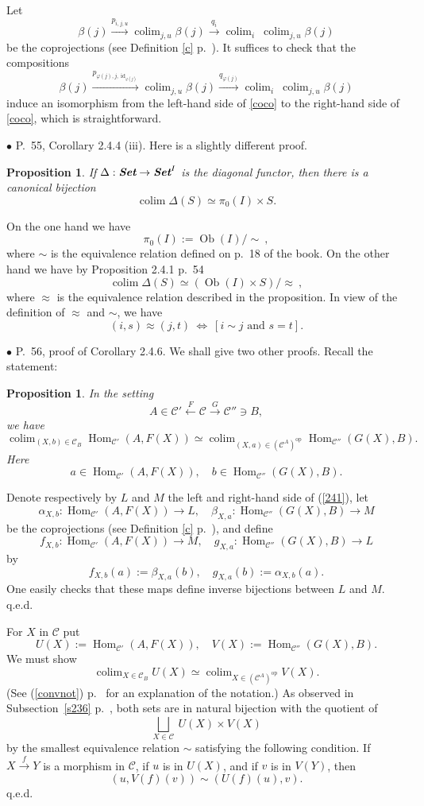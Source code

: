 \documentclass[12pt]{article}
\newtheorem{prop}[thm]{Proposition}
\theoremstyle{remark}%
\newcommand{\bu}{\bullet}
\newcommand{\n}{\noindent}
\newcommand{\C}{\mathcal C}
\newcommand{\p}{\varphi}
\newcommand{\pf}{\n{\em Proof. }}
\newcommand{\xr}{\xrightarrow}
\newcommand{\be}{\begin{equation}}
\newcommand{\ee}{\end{equation}}
\newcommand{\bp}{\begin{prop}}
\newcommand{\ep}{\end{prop}}
\newcommand{\cn}{(See (\ref{convnot}) p.~\pageref{convnot} for an explanation of the notation.) }
\DeclareMathOperator*{\coli}{colim}
\DeclareMathOperator*{\co}{colim}
\DeclareMathOperator{\id}{id}
\DeclareMathOperator{\Hom}{Hom}
\DeclareMathOperator{\h}{Hom}
\DeclareMathOperator{\Ob}{Ob}
\DeclareMathOperator{\op}{op}
\begin{document}
Let 
$$ 
\beta(j)\xrightarrow{p_{i,j,u}}\co_{j,u}\beta(j)\xrightarrow{q_i}\co_i\ \co_{j,u}\beta(j)
$$ 
be the coprojections (see Definition \ref{c} p.~\pageref{c}). It suffices to check that the compositions 
$$
\beta(j)\xrightarrow{p_{\p(j),j,\id_{\p(j)}}}\co_{j,u}\beta(j)\xrightarrow{q_{\p(j)}}\co_i\ \co_{j,u}\beta(j)
$$ 
induce an isomorphism from the left-hand side of \eqref{coco} to the right-hand side of \eqref{coco}, which is straightforward. 


\n$\bu$ P.~55, Corollary 2.4.4 (iii). Here is a slightly different proof. 
%
\bp 
If $\Delta:\textbf{\em Set}\to\textbf{\em Set}^I$ is the diagonal functor, then there is a canonical bijection
$$
\coli\Delta(S)\simeq\pi_0(I)\times S.
$$
\ep 
%
\pf On the one hand we have 
$$
\pi_0(I):=\Ob(I)/\!\!\sim\ , 
$$
where $\sim$ is the equivalence relation defined on p.~18 of the book. On the other hand  we have by Proposition 2.4.1 p.~54
$$
\coli\Delta(S)\simeq(\Ob(I)\times S)/\!\!\approx\ ,
$$
where $\approx$ is the equivalence relation described in the proposition. In view of the definition of $\approx$ and $\sim$, we have 
$$
(i,s)\approx(j,t)\ \iff\ [i\sim j\text{ and }s=t].
$$  


\n$\bu$ P.~56, proof of Corollary 2.4.6. We shall give two other proofs. Recall the statement: 
%
\bp 
In the setting 
% 
\begin{equation}\label{241s}
A\in\C'\xleftarrow{F}\C\xrightarrow{G}\C''\ni B, 
\end{equation} 
% 
we have 
% 
\begin{equation}\label{241} 
\coli_{(X,b)\in\C_B}\Hom_{\C'}(A,F(X))\simeq 
\coli_{(X,a)\in(\C^A)^{\op}}\Hom_{\C''}(G(X),B). 
\end{equation} 
% 
Here  
$$
a\in\Hom_{\C'}(A,F(X)),\quad b\in\Hom_{\C''}(G(X),B). 
$$ 
\ep
% 
\n{\em First proof.} Denote respectively by $L$ and $M$ the left and right-hand side of (\ref{241}), let 
$$
\alpha_{X,b}:\Hom_{\C'}(A,F(X))\to L,\quad\beta_{X,a}:\Hom_{\C''}(G(X),B)\to M
$$
be the coprojections (see Definition \ref{c} p.~\pageref{c}), and define 
$$
f_{X,b}:\Hom_{\C'}(A,F(X))\to M,\quad g_{X,a}:\Hom_{\C''}(G(X),B)\to L
$$
by
$$
f_{X,b}(a):=\beta_{X,a}(b),\quad g_{X,a}(b):=\alpha_{X,b}(a).
$$
One easily checks that these maps define inverse bijections between $L$ and $M$. q.e.d. 

\n{\em Second proof.} For $X$ in $\C$ put 
% 
\be\label{p2}
U(X):=\h_{\C'}(A,F(X)),\quad V(X):=\h_{\C''}(G(X),B). 
\ee
% 
We must show 
$$
\co_{X\in\C_B}U(X)\simeq\co_{X\in(\C^A)^{\op}}V(X). 
$$ 
\cn As observed in Subsection~\ref{s236} p.~\pageref{s236}, both sets are in natural bijection with the quotient of 
$$
\bigsqcup_{X\in\C}\ U(X)\times V(X) 
$$ 
by the smallest equivalence relation $\sim$ satisfying the following condition. If $X\xr fY$ is a morphism in $\C$, if $u$ is in $U(X)$, and if $v$ is in $V(Y)$, then 
$$
(u,V(f)(v))\sim(U(f)(u),v). 
$$ 
q.e.d. 
\end{document}
